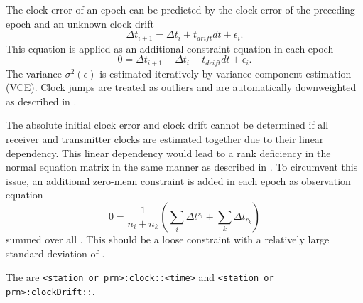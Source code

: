 The clock error of an epoch can be predicted by the clock error
of the preceding epoch and an unknown clock drift
\begin{equation}
  \Delta t_{i+1} = \Delta t_{i} + t_{drift} dt + \epsilon_i.
\end{equation}
This equation is applied as an additional constraint equation in each epoch
\begin{equation}
  0 = \Delta t_{i+1} - \Delta t_{i} - t_{drift} dt + \epsilon_i.
\end{equation}
The variance $\sigma^2(\epsilon)$ is estimated iteratively by variance component estimation (VCE).
Clock jumps are treated as outliers and are automatically downweighted as described in
.

The absolute initial clock error and clock drift cannot be determined if all receiver
and transmitter clocks are estimated together due to their linear dependency.
This linear dependency would lead to a rank deficiency in the normal equation matrix in the same
manner as described in .
To circumvent this issue, an additional zero-mean constraint is added in each epoch
as observation equation
\begin{equation}
  0 = \frac{1}{n_i + n_k} (\sum_i \Delta t^{s_i} + \sum_k \Delta t_{r_k})
\end{equation}
summed over all .
This should be a loose constraint with a relatively large standard deviation of .

The  are \verb|<station or prn>:clock::<time>|
and \verb|<station or prn>:clockDrift::|.



